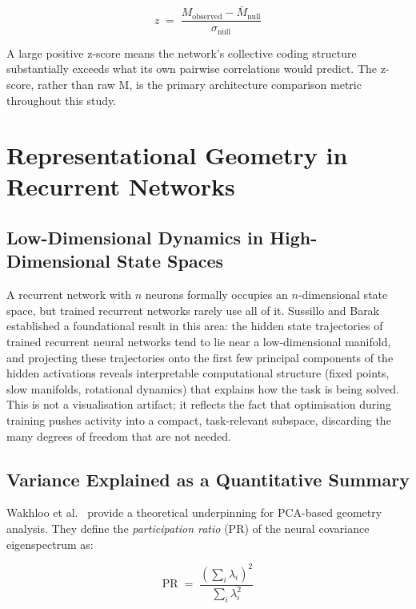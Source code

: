 \documentclass[12pt,twoside]{report}
\begin{document}
\begin{equation}
    z \;=\; \frac{M_\text{observed} - \bar{M}_\text{null}}{\sigma_\text{null}}
    \label{eq:zscore}
\end{equation}

A large positive z-score means the network's collective coding structure substantially 
exceeds what its own pairwise correlations would predict. The z-score, rather than raw 
M, is the primary architecture comparison metric throughout this study. 


\section{Representational Geometry in Recurrent Networks}
\label{sec:geometry}

\subsection{Low-Dimensional Dynamics in High-Dimensional State Spaces}

A recurrent network with $n$ neurons formally occupies an $n$-dimensional state space, 
but trained recurrent networks rarely use all of it. Sussillo and Barak~\cite{sussillo2013} 
established a foundational result in this area: the hidden state trajectories of trained 
recurrent neural networks tend to lie near a low-dimensional manifold, and projecting 
these trajectories onto the first few principal components of the hidden activations 
reveals interpretable computational structure (fixed points, slow manifolds,
rotational dynamics) that explains how the task is being solved. This is not a 
visualisation artifact; it reflects the fact that optimisation during training pushes 
activity into a compact, task-relevant subspace, discarding the many degrees of freedom 
that are not needed.

\subsection{Variance Explained as a Quantitative Summary}

Wakhloo et al.~\cite{wakhloo2026} provide a theoretical underpinning for PCA-based
geometry analysis. They define the \emph{participation ratio} (PR) of the neural
covariance eigenspectrum as:

\begin{equation}
    \text{PR} \;=\; \frac{\left(\displaystyle\sum_i \lambda_i\right)^2}{\displaystyle\sum_i \lambda_i^2}
    \label{eq:pr}
\end{equation}
\end{document}
